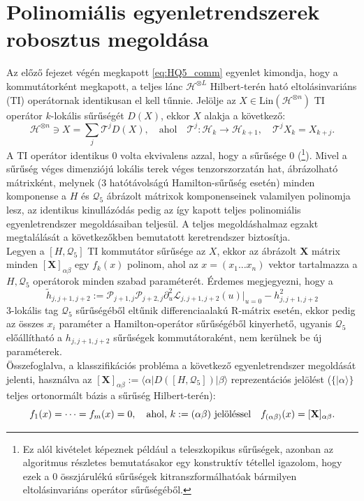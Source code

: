 \documentclass[12pt,a4paper,oneside]{report}
\renewcommand{\L}{\mathcal{L}}
\renewcommand{\P}{\mathcal{P}}
\newcommand{\T}{\mathcal{T}}
\newcommand{\Q}{\mathcal{Q}}
\newcommand{\Xmat}{\mathbf{X}}
\newcommand{\hjtri}{h_{j,j+1,j+2}}
\newcommand{\htil}{\tilde{h}}
\newcommand{\Hil}{\mathscr{H}}
\newcommand{\ahol}{\quad \text{ahol} \quad}
\begin{document}
\section{Polinomiális egyenletrendszerek robosztus megoldása}
Az előző fejezet végén megkapott \eqref{eq:HQ5_comm} egyenlet kimondja, hogy a kommutátorként megkapott, a teljes lánc $\Hil^{\otimes L}$ Hilbert-terén ható eltolásinvariáns (TI) operátornak identikusan el kell tűnnie. Jelölje az $X\in\mathrm{Lin}(\Hil^{\otimes n})$ TI operátor $k$-lokális sűrűségét $D(X)$, ekkor $X$ alakja a következő:
\begin{equation}
    \Hil^{\otimes n}\ni X=\sum_j \T^j D(X), \ahol  \T^{j}:\Hil_k \rightarrow \Hil_{k+1}, \quad \T^j X_k=X_{k+j}.
\end{equation}
A TI operátor identikus 0 volta ekvivalens azzal, hogy a sűrűsége 0 (\footnote{Ez alól kivételet képeznek például a teleszkopikus sűrűségek, azonban az algoritmus részletes bemutatásakor egy konstruktív tétellel igazolom, hogy ezek a 0 összjárulékú sűrűségek kitranszformálhatóak bármilyen eltolásinvariáns operátor sűrűségéből.}). Mivel a sűrűség véges dimenziójú lokális terek véges tenzorszorzatán hat, ábrázolható mátrixként, melynek (3 hatótávolságú Hamilton-sűrűség esetén) minden komponense a $H$ és $\Q_5$ ábrázolt mátrixok komponenseinek valamilyen polinomja lesz, az identikus kinullázódás pedig az így kapott teljes polinomiális egyenletrendszer megoldásaiban teljesül. A teljes megoldáshalmaz egzakt megtalálását a következőkben bemutatott keretrendszer biztosítja.\\

Legyen a $[H,\Q_5]$ TI kommutátor sűrűsége az $X$, ekkor az ábrázolt $\mathbf{X}$ mátrix minden $[\mathbf{X}]_{\alpha\beta}$ egy $f_k(x)$ polinom, ahol az $x=(x_1...x_n)$ vektor tartalmazza a $H,\Q_5$ operátorok minden szabad paraméterét. Érdemes megjegyezni, hogy a
\begin{equation}\label{eq:htil}
    \htil_{j,j+1,j+2}:=\P_{j+1,j}\P_{j+2,j}\partial_u^2\L_{j,j+1,j+2}(u)\big|_{u=0}-\hjtri^2
\end{equation}
3-lokális tag $\Q_5$ sűrűségéből eltűnik differenciaalakú R-mátrix esetén, ekkor pedig az összes $x_i$ paraméter a Hamilton-operátor sűrűségéből kinyerhető, ugyanis $\Q_5$ előállítható a $\hjtri$ sűrűségek kommutátoraként, nem kerülnek be új paraméterek.\\
Összefoglalva, a klasszifikációs probléma a következő egyenletrendszer megoldását jelenti, használva az $[\Xmat]_{\alpha\beta}:=\langle\alpha|D([H,\Q_5])|\beta\rangle$ reprezentációs jelölést ($\{|\alpha\rangle\}$ teljes ortonormált bázis a sűrűség Hilbert-terén):
\begin{equation}
    f_1(x)=\dots=f_m(x)=0, \quad \text{ahol, } k:=(\alpha\beta) \textnormal{ jelöléssel}\quad  f_{(\alpha\beta)}(x)=[\Xmat]_{\alpha\beta}.
\end{equation}
\end{document}
